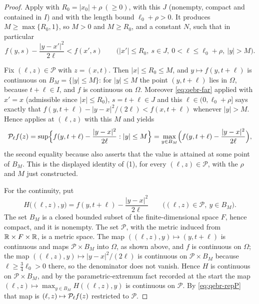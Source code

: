 \begin{proof}
Apply  with $R_0=|x_0|+\rho\ (\ge0)$, with this
$J$ (nonempty, compact and contained in $I$) and with the length bound
$\ell_0+\rho>0$. It produces $M\ge\max\{R_0,1\}$, so $M>0$ and $M\ge R_0$, and a
constant $N$, such that in particular
\begin{equation}\label{eq:qebr-far}
  f(y,s)-\frac{|y-x'|^2}{2\ell}<f(x',s)
  \qquad\bigl(|x'|\le R_0,\ s\in J,\ 0<\ell\le\ell_0+\rho,\ |y|>M\bigr).
\end{equation}

Fix $(\ell,z)\in\mathcal P$ with $z=(x,t)$. Then $|x|\le R_0\le M$, and
$y\mapsto f(y,t+\ell)$ is continuous on $B_M=\{|y|\le M\}$: for $|y|\le M$ the
point $(y,t+\ell)$ lies in $\Omega$, because $t+\ell\in I$, and $f$ is continuous
on $\Omega$. Moreover \eqref{eq:qebr-far} applied with $x'=x$ (admissible since
$|x|\le R_0$), $s=t+\ell\in J$ and this $\ell\in(0,\ell_0+\rho]$ says exactly
that $f(y,t+\ell)-|y-x|^2/(2\ell)<f(x,t+\ell)$ whenever $|y|>M$. Hence
 applies at $(\ell,z)$ with this $M$ and yields
\begin{equation}\label{eq:qebr-repP}
  \mathcal{P}_\ell f(z)
  =\sup\Bigl\{f(y,t+\ell)-\frac{|y-x|^2}{2\ell}:|y|\le M\Bigr\}
  =\max_{y\in B_M}\Bigl(f(y,t+\ell)-\frac{|y-x|^2}{2\ell}\Bigr),
\end{equation}
the second equality because  also asserts that the value
is attained at some point of $B_M$. This is the displayed identity of (1), for
every $(\ell,z)\in\mathcal P$, with the $\rho$ and $M$ just constructed.

For the continuity, put
\[
  H\bigl((\ell,z),y\bigr)=f(y,t+\ell)-\frac{|y-x|^2}{2\ell}
  \qquad\bigl((\ell,z)\in\mathcal P,\ y\in B_M\bigr).
\]
The set $B_M$ is a closed bounded subset of the finite-dimensional space $F$,
hence compact, and it is nonempty. The set $\mathcal P$, with the metric induced
from $\mathbb{R}\times F\times\mathbb{R}$, is a metric space. The map
$((\ell,z),y)\mapsto(y,t+\ell)$ is continuous and maps $\mathcal P\times B_M$
into $\Omega$, as shown above, and $f$ is continuous on $\Omega$; the map
$((\ell,z),y)\mapsto|y-x|^2/(2\ell)$ is continuous on $\mathcal P\times B_M$
because $\ell\ge\tfrac34\ell_0>0$ there, so the denominator does not vanish.
Hence $H$ is continuous on $\mathcal P\times B_M$, and by the parametric-extremum
fact recorded at the start the map
$(\ell,z)\mapsto\max_{y\in B_M}H((\ell,z),y)$ is continuous on $\mathcal P$. By
\eqref{eq:qebr-repP} that map is $(\ell,z)\mapsto\mathcal{P}_\ell f(z)$ restricted to
$\mathcal P$.


\end{proof}

